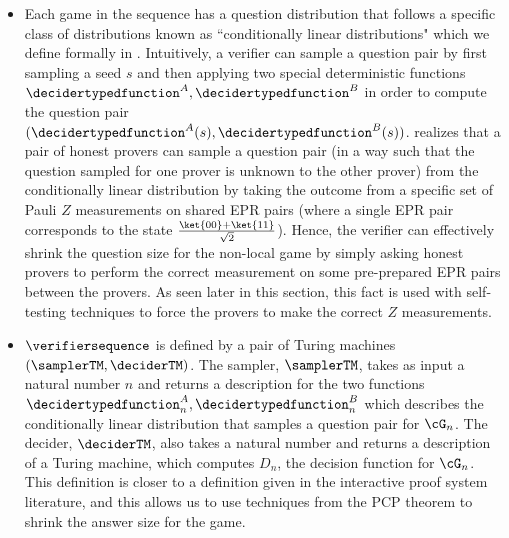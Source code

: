 \begin{itemize}
	\item Each game in the sequence has a question distribution that follows a specific class of distributions known as ``conditionally linear distributions" which we define formally in . Intuitively, a verifier can sample a question pair by first sampling a seed $s$ and then applying two special deterministic functions $\decidertypedfunction^A, \decidertypedfunction^B$ in order to compute the question pair $(\decidertypedfunction^A(s),  \decidertypedfunction^B(s))$. \cite{jiMIPRE2022a} realizes that a pair of honest provers can sample a question pair (in a way such that the question sampled for one prover is unknown to the other prover) from the conditionally linear distribution by taking the outcome from a specific set of Pauli $Z$ measurements on shared EPR pairs (where a single EPR pair corresponds to the state $\frac{\ket{00} + \ket{11}}{\sqrt{2}}$). Hence, the verifier can effectively shrink the question size for the non-local game by simply asking honest provers to perform the correct measurement on some pre-prepared EPR pairs between the provers. As seen later in this section, this fact is used with self-testing techniques to force the provers to make the correct $Z$ measurements.
	\item $\verifiersequence$ is defined by a pair of Turing machines $(\samplerTM, \deciderTM)$. The sampler, $\samplerTM$, takes as input a natural number $n$ and returns a description for the two functions $\decidertypedfunction^A_n, \decidertypedfunction^B_n$ which describes the conditionally linear distribution that samples a question pair for $\cG_n$. The decider,  $\deciderTM$, also takes a natural number and returns a description of a Turing machine, which computes $D_n$, the decision function for $\cG_n$. This definition is closer to a definition given in the interactive proof system literature, and this allows us to use techniques from the PCP theorem to shrink the answer size for the game. 
\end{itemize}

